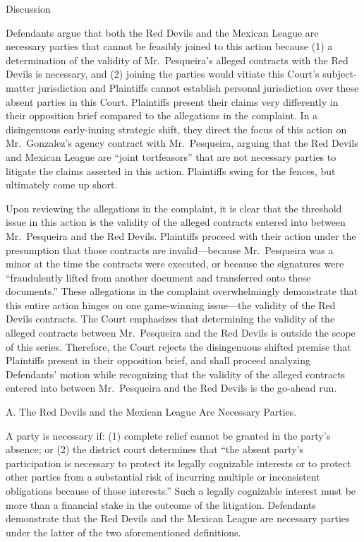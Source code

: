 \documentclass[11pt,letterpaper,twoside]{article}
\begin{document}
{Discussion}

Defendants argue that both the Red Devils and the Mexican League are
necessary parties that cannot be feasibly joined to this action because
(1) a determination of the validity of Mr.~Pesqueira's alleged contracts
with the Red Devils is necessary, and (2) joining the parties would
vitiate this Court's subject-matter jurisdiction and Plaintiffs cannot
establish personal jurisdiction over these absent parties in this Court.
Plaintiffs present their claims very differently in their opposition
brief compared to the allegations in the complaint. In a disingenuous
early-inning strategic shift, they direct the focus of this action on
Mr.~Gonzalez's agency contract with Mr.~Pesqueira, arguing that the Red
Devils and Mexican League are ``joint tortfeasors'' that are not
necessary parties to litigate the claims asserted in this action.
Plaintiffs swing for the fences, but ultimately come up short.

Upon reviewing the allegations in the complaint, it is clear that the
threshold issue in this action is the validity of the alleged contracts
entered into between Mr.~Pesqueira and the Red Devils. Plaintiffs
proceed with their action under the presumption that those contracts are
invalid---because Mr.~Pesqueira was a minor at the time the contracts
were executed, or because the signatures were ``fraudulently lifted from
another document and transferred onto these documents.'' These
allegations in the complaint overwhelmingly demonstrate that this entire
action hinges on one game-winning issue---the validity of the Red Devils
contracts. The Court emphasizes that determining the validity of the
alleged contracts between Mr.~Pesqueira and the Red Devils is outside
the scope of this series. Therefore, the Court rejects the disingenuous
shifted premise that Plaintiffs present in their opposition brief, and
shall proceed analyzing Defendants' motion while recognizing that the
validity of the alleged contracts entered into between Mr.~Pesqueira and
the Red Devils is the go-ahead run.

{A. The Red Devils and the Mexican League Are Necessary Parties.}

A party is necessary if: (1) complete relief cannot be granted in the
party's absence; or (2) the district court determines that ``the absent
party's participation is necessary to protect its legally cognizable
interests or to protect other parties from a substantial risk of
incurring multiple or inconsistent obligations because of those
interests.'' Such a legally cognizable interest must be more than a
financial stake in the outcome of the litigation. Defendants demonstrate
that the Red Devils and the Mexican League are necessary parties under
the latter of the two aforementioned definitions.
\end{document}
